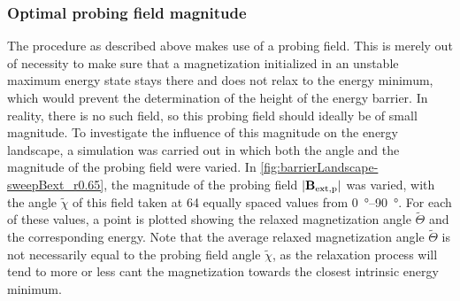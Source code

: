 \documentclass[11pt,a4paper,english,twoside]{article}
\begin{document}
\subsubsection{Optimal probing field magnitude}
The procedure as described above makes use of a probing field. This is merely out of necessity to make sure that a magnetization initialized in an unstable maximum energy state stays there and does not relax to the energy minimum, which would prevent the determination of the height of the energy barrier. In reality, there is no such field, so this probing field should ideally be of small magnitude. To investigate the influence of this magnitude on the energy landscape, a simulation was carried out in which both the angle and the magnitude of the probing field were varied. In \cref{fig:barrierLandscape-sweepBext_r0.65}, the magnitude of the probing field $\abs{\vb{B_\mathrm{ext,p}}}$ was varied, with the angle $\widetilde{\chi}$ of this field taken at 64 equally spaced values from \SIrange{0}{90}{\degree}. For each of these values, a point is plotted showing the relaxed magnetization angle $\widetilde{\Theta}$ and the corresponding energy. Note that the average relaxed magnetization angle $\widetilde{\Theta}$ is not necessarily equal to the probing field angle $\widetilde{\chi}$, as the relaxation process will tend to more or less cant the magnetization towards the closest intrinsic energy minimum. \par
\end{document}

